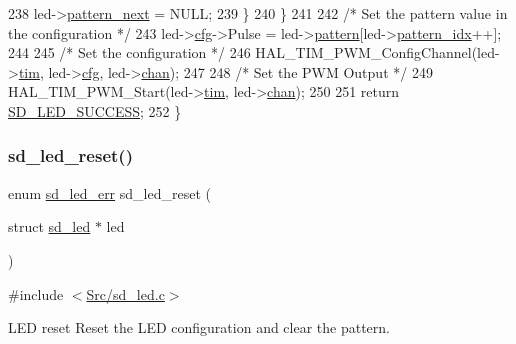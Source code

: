 \begin{DoxyCode}
238             led->\mbox{\hyperlink{structsd__led_aa3c569d89c64771860f259ee403b8f6a}{pattern\_next}} = NULL;
239         \}
240     \}
241   
242     \textcolor{comment}{/* Set the pattern value in the configuration */}
243     led->\mbox{\hyperlink{structsd__led_acaf3272a1f93d49be9ec4c31804252e6}{cfg}}->Pulse = led->\mbox{\hyperlink{structsd__led_a70c2ff7a80dc607b1f146e4aa1494c43}{pattern}}[led->\mbox{\hyperlink{structsd__led_a60a9dc074fe55a93fc9752d68bef8673}{pattern\_idx}}++];
244   
245     \textcolor{comment}{/* Set the configuration */}
246     HAL\_TIM\_PWM\_ConfigChannel(led->\mbox{\hyperlink{structsd__led_a6e46bfc6fae939f8fc5ee53ea4551f18}{tim}}, led->\mbox{\hyperlink{structsd__led_acaf3272a1f93d49be9ec4c31804252e6}{cfg}}, led->\mbox{\hyperlink{structsd__led_afb67f3e4e204785118073a96b76614d6}{chan}});
247   
248     \textcolor{comment}{/* Set the PWM Output */}
249     HAL\_TIM\_PWM\_Start(led->\mbox{\hyperlink{structsd__led_a6e46bfc6fae939f8fc5ee53ea4551f18}{tim}}, led->\mbox{\hyperlink{structsd__led_afb67f3e4e204785118073a96b76614d6}{chan}});
250   
251     \textcolor{keywordflow}{return} \mbox{\hyperlink{group___s_d___l_e_d___types_gga4f347a1003b4089de88a7f0fc62c1071ad3d9e41d4cdb2e47e8754d0a1a3824e2}{SD\_LED\_SUCCESS}};
252 \}
\end{DoxyCode}
\mbox{\label{group___s_d___l_e_d___functions_ga1a7bb12d105f503fec86d069725f6591}} 
\subsubsection{\texorpdfstring{sd\+\_\+led\+\_\+reset()}{sd\_led\_reset()}}
{\footnotesize\ttfamily enum \mbox{\hyperlink{group___s_d___l_e_d___types_ga4f347a1003b4089de88a7f0fc62c1071}{sd\+\_\+led\+\_\+err}} sd\+\_\+led\+\_\+reset (\begin{DoxyParamCaption}\item[{struct \mbox{\hyperlink{structsd__led}{sd\+\_\+led}} $\ast$}]{led }\end{DoxyParamCaption})}



{\ttfamily \#include $<$\mbox{\hyperlink{sd__led_8c}{Src/sd\+\_\+led.\+c}}$>$}



L\+ED reset Reset the L\+ED configuration and clear the pattern. 


